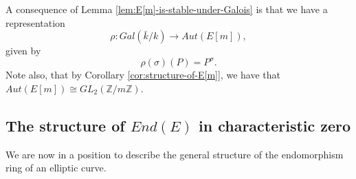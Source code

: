 A consequence of Lemma \ref{lem:E[m]-is-stable-under-Galois} is that we have a
representation
\begin{equation*}
\rho : Gal(\bar{k} / k) \rightarrow Aut(E[m]),
\end{equation*}
given by
\begin{equation}
  \label{eq:Galois-representation}
  \rho (\sigma) (P) = P^{\sigma}.
\end{equation}
Note also, that by Corollary \ref{cor:structure-of-E[m]}, we have that $Aut(E[m])
\cong GL_{2}(\mathbb{Z} / m \mathbb{Z})$.

\subsection{The structure of $End(E)$ in characteristic zero}
\label{sec:struct-ende-char-zero}

We are now in a position to describe the general structure of the endomorphism ring
of an elliptic curve.

